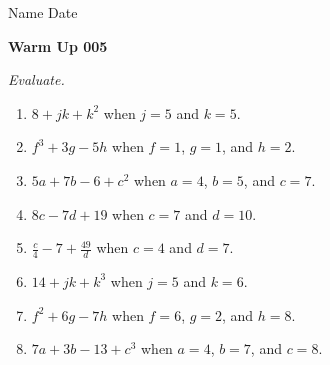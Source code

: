 \documentclass[twocolumn,12pt]{article}
\begin{document}
\noindent Name \makebox[3.5cm]{\hrulefill} \hfill Date \makebox[2cm]{\hrulefill} \par
\vspace*{0.1in}
\noindent \Large \textbf{Warm Up 005} \normalsize \par \textit{Evaluate.}\par
\begin{enumerate}


\item \(8+jk+k^{2}\) when \(j=5\) and \(k=5\).\vfill



\item \(f^{3}+3g-5h\) when \(f=1\), \(g=1\), and \(h=2\).\vfill



\item \(5a+7b-6+c^{2}\) when \(a=4\), \(b=5\), and \(c=7\).\vfill



\item \(8c-7d+19\) when \(c=7\) and \(d=10\).\vfill



\item \(\displaystyle \frac{c}{4}-7+\frac{49}{d}\) when \(c=4\) and \(d=7\).\vfill



\item \(14+jk+k^{3}\) when \(j=5\) and \(k=6\).\vfill



\item \(f^{2}+6g-7h\) when \(f=6\), \(g=2\), and \(h=8\).\vfill



\item \(7a+3b-13+c^{3}\) when \(a=4\), \(b=7\), and \(c=8\).\vfill











\end{enumerate}
\newpage
\end{document}
